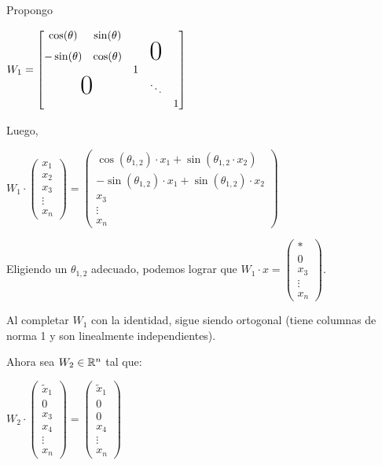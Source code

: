 \documentclass[]{article}
\begin{document}
Propongo
\begin{center}
	$W_1=\begin{bmatrix}
		 \cos(\theta) 	& 	\sin(\theta)	&		&		&		\\
		-\sin(\theta) 	& 	\cos(\theta)	&		&\gran{0}&		\\
			 			&					&1		&		&		\\
		\hspace{1cm}\gran{0}\hspace{-0.5cm}	&					&		&\ddots &		\\
						&					&		&		&1

	\end{bmatrix}$
\end{center}

Luego,
\begin{center}
	$W_1\cdot \begin{pmatrix}
		x_1 \\ x_2 \\ x_3 \\ \vdots \\ x_n
	\end{pmatrix} = \begin{pmatrix}
		\cos(\theta_{1,2})\cdot x_1 + \sin(\theta_{1,2}\cdot x_2)\\
		-\sin(\theta_{1,2})\cdot x_1 + \sin(\theta_{1,2})\cdot x_2\\
		x_3\\
		\vdots
		\\x_n
	\end{pmatrix}$
\end{center}


Eligiendo un $\theta_{1,2}$ adecuado, podemos lograr que $W_1\cdot x = \begin{pmatrix}*\\0\\x_3\\\vdots\\x_n\end{pmatrix}$.

Al completar $W_1$ con la identidad, sigue siendo ortogonal (tiene columnas de norma 1 y son linealmente independientes).

Ahora sea $W_2\in\mathbb{R}^n$ tal que:
\begin{center}
	$W_2 \cdot \begin{pmatrix}
		\tilde x_1 \\
		0 \\
		x_3 \\
		x_4 \\
		\vdots \\
		x_n
	\end{pmatrix} = \begin{pmatrix}
		\tilde x_1 \\
		0 \\
		0 \\
		x_4 \\
		\vdots \\
		x_n
	\end{pmatrix}$
\end{center}
\end{document}
